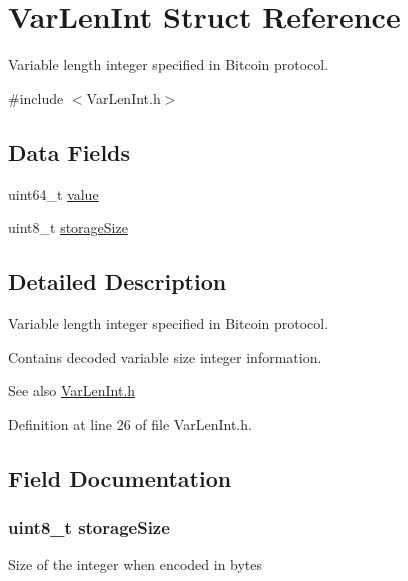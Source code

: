 \hypertarget{struct_m_i_var_len_int}{
\section{VarLenInt Struct Reference}
\label{struct_m_i_var_len_int}
}


Variable length integer specified in Bitcoin protocol.  




{\ttfamily \#include $<$VarLenInt.h$>$}

\subsection*{Data Fields}
\begin{DoxyCompactItemize}
\item 
uint64\_\-t \hyperlink{struct_m_i_var_len_int_a4e630859cc0e2a22bd6acf39a6a8e218}{value}
\item 
uint8\_\-t \hyperlink{struct_m_i_var_len_int_af922c72fe1d5915971491918ff5f923e}{storageSize}
\end{DoxyCompactItemize}


\subsection{Detailed Description}
Variable length integer specified in Bitcoin protocol. 

Contains decoded variable size integer information. \begin{DoxySeeAlso}{See also}
\hyperlink{_m_i_var_len_int_8h}{VarLenInt.h} 
\end{DoxySeeAlso}


Definition at line 26 of file VarLenInt.h.



\subsection{Field Documentation}
\hypertarget{struct_m_i_var_len_int_af922c72fe1d5915971491918ff5f923e}{
\subsubsection[{storageSize}]{\setlength{\rightskip}{0pt plus 5cm}uint8\_\-t {\bf storageSize}}}
\label{struct_m_i_var_len_int_af922c72fe1d5915971491918ff5f923e}
Size of the integer when encoded in bytes 


